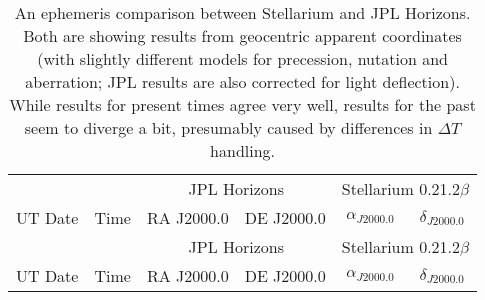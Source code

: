 
\begin{longtable}{r@{\,}r|r@{h\,}r@{m\,}r<{s}|r@{°\,}r@{'\,}r<{''}||r@{h\,}r@{m\,}r<{s}|r@{°\,}r@{'\,}r<{''}}

\caption{An ephemeris comparison between Stellarium and JPL
  Horizons. Both are showing results from geocentric apparent
  coordinates (with slightly different models for precession, nutation
  and aberration; JPL results are also corrected for light
  deflection). While results for present times agree very well,
  results for the past seem to diverge a bit, presumably caused by
  differences in $\Delta T$ handling.}
\label{tab:accuracy:UT}\\
\multicolumn{2}{c}{}&\multicolumn{6}{c||}{JPL Horizons} & \multicolumn{6}{c}{Stellarium 0.21.2$\beta$}\\ 
UT Date   & Time   & \multicolumn{3}{c}{RA J2000.0} & \multicolumn{3}{c||}{DE J2000.0} & \multicolumn{3}{c}{$\alpha_{J2000.0}$} & \multicolumn{3}{c}{$\delta_{J2000.0}$} \\
\midrule
\endfirsthead
  
\multicolumn{2}{c}{}&\multicolumn{6}{c||}{JPL Horizons} & \multicolumn{6}{c}{Stellarium 0.21.2$\beta$}\\ 
UT Date   & Time   & \multicolumn{3}{c}{RA J2000.0} & \multicolumn{3}{c||}{DE J2000.0} & \multicolumn{3}{c}{$\alpha_{J2000.0}$} & \multicolumn{3}{c}{$\delta_{J2000.0}$} \\
\midrule\endhead
  

\end{longtable}
